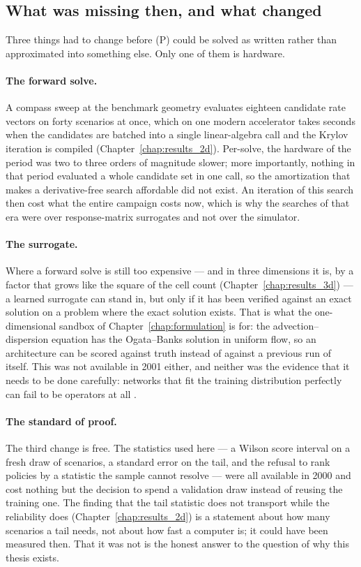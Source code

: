\documentclass[11pt]{article}
\begin{document}
\subsection{What was missing then, and what changed}

Three things had to change before (P) could be solved as written rather than
approximated into something else. Only one of them is hardware.

\paragraph{The forward solve.} A compass sweep at the benchmark geometry evaluates
eighteen candidate rate vectors on forty scenarios at once, which on one modern
accelerator takes seconds when the candidates are batched into a single
linear-algebra call and the Krylov iteration is compiled
(Chapter~\ref{chap:results_2d}). Per-solve, the hardware of the period was two to
three orders of magnitude slower; more importantly, nothing in that period
evaluated a whole candidate set in one call, so the amortization that makes a
derivative-free search affordable did not exist. An iteration of this search then
cost what the entire campaign costs now, which is why the searches of that era
were over response-matrix surrogates and not over the simulator.

\paragraph{The surrogate.} Where a forward solve is still too expensive --- and in
three dimensions it is, by a factor that grows like the square of the cell count
(Chapter~\ref{chap:results_3d}) --- a learned surrogate can stand in, but only if
it has been verified against an exact solution on a problem where the exact
solution exists. That is what the one-dimensional sandbox of
Chapter~\ref{chap:formulation} is for: the advection--dispersion equation has the
Ogata--Banks solution \citep{ogata1961solution} in uniform flow, so an
architecture can be scored against truth instead of against a previous run of
itself. This was not available in 2001 either, and neither was the
evidence that it needs to be done carefully: networks that fit the training
distribution perfectly can fail to be operators at all
\citep{krishnapriyan2021failure,wang2021gradient}.

\paragraph{The standard of proof.} The third change is free. The statistics used
here --- a Wilson score interval \citep{wilson1927probable} on a fresh draw of
scenarios, a standard error on the tail, and the refusal to rank policies by a
statistic the sample cannot resolve --- were all available in 2000 and cost
nothing but the decision to spend a validation draw instead of reusing the
training one. The finding that the tail statistic does not transport while the
reliability does (Chapter~\ref{chap:results_2d}) is a statement about how many
scenarios a tail needs, not about how fast a computer is; it could have been
measured then. That it was not is the honest answer to the question of why this
thesis exists.
\end{document}
